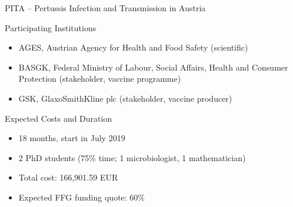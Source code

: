 \documentclass{beamer}\usepackage[]{graphicx}\usepackage[]{color}
\begin{document}
\begin{frame}[fragile]{\scriptsize{PITA -- Pertussis Infection and Transmission in Austria}}
\begin{center}

\begin{block}{Participating Institutions}
\begin{itemize}
  \item AGES, Austrian Agency for Health and Food Safety (scientific)
  \item BASGK, Federal Ministry of Labour, Social Affairs, Health and Consumer Protection (stakeholder, vaccine programme)
  \item GSK, GlaxoSmithKline plc (stakeholder, vaccine producer)
\end{itemize}
\end{block}

\begin{block}{Expected Costs and Duration}
\begin{itemize}
  \item 18 months, start in July 2019
  \item 2 PhD students (75\% time; 1 microbiologist, 1 mathematician)
  \item Total cost: 166,901.59 EUR 
  \item Expected FFG funding quote: 60\%
\end{itemize}
\end{block}

\end{center}
\end{frame}

\end{document}
